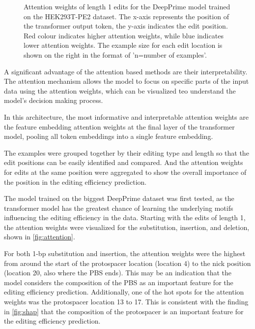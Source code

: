 \begin{figure}
    \centering
    \caption[Attention weights for the DeepPrime model trained on the HEK293T-PE2 dataset]{Attention weights of length 1 edits for the DeepPrime model trained on the HEK293T-PE2 dataset. The x-axis represents the position of the transformer output token, the y-axis indicates the edit position. Red colour indicates higher attention weights, while blue indicates lower attention weights. The example size for each edit location is shown on the right in the format of 'n=number of examples'.}
    \label{fig:attention}
\end{figure}

A significant advantage of the attention based methods are their interpretability. The attention mechanism allows the model to focus on specific parts of the input data using the attention weights, which can be visualized teo understand the model's decision making process. 

In this architecture, the most informative and interpretable attention weights are the feature embedding attention weights at the final layer of the transformer model, pooling all token embeddings into a single feature embedding. 

The examples were grouped together by their editing type and length so that the edit positions can be easily identified and compared. And the attention weights for edits at the same position were aggregated to show the overall importance of the position in the editing efficiency prediction.

The model trained on the biggest DeepPrime dataset was first tested, as the transformer model has the greatest chance of learning the underlying motifs influencing the editing efficiency in the data. Starting with the edits of length 1, the attention weights were visualized for the substitution, insertion, and deletion, shown in \autoref{fig:attention}. 

For both 1-bp substitution and insertion, the attention weights were the highest from around the start of the protospacer location (location 4) to the nick position (location 20, also where the PBS ends). This may be an indication that the model considers the composition of the PBS as an important feature for the editing efficiency prediction. Additionally, one of the hot spots for the attention weights was the protospacer location 13 to 17. This is consistent with the finding in \autoref{fig:shap} that the composition of the protospacer is an important feature for the editing efficiency prediction.

